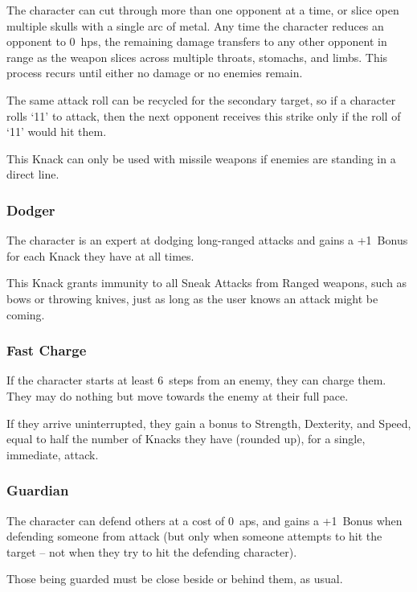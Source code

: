 \begin{multicols}{2}
The character can cut through more than one opponent at a time, or slice open multiple skulls with a single arc of metal.
Any time the character reduces an opponent to 0~\glspl{hp}, the remaining damage transfers to any other opponent in range as the weapon slices across multiple throats, stomachs, and limbs.
This process recurs until either no damage or no enemies remain.

The same attack roll can be recycled for the secondary target, so if a character rolls `11' to attack, then the next opponent receives this strike only if the roll of `11' would hit them.

This Knack can only be used with missile weapons if enemies are standing in a direct line.

\subsubsection{Dodger}
\label{dodger}

The character is an expert at dodging long-ranged attacks and gains a +1~Bonus for each Knack they have at all times.

This Knack grants immunity to all Sneak Attacks from Ranged weapons, such as bows or throwing knives, just as long as the user knows an attack might be coming.

\subsubsection{Fast Charge}

If the character starts at least 6~\glspl{step} from an enemy, they can charge them.
They may do nothing but move towards the enemy at their full pace.

If they arrive uninterrupted, they gain a bonus to Strength, Dexterity, and Speed, equal to half the number of Knacks they have (rounded up), for a single, immediate, attack.

\subsubsection{Guardian}

The character can defend others at a cost of 0~\glspl{ap}, and gains a +1~Bonus when defending someone from attack (but only when someone attempts to hit the target -- not when they try to hit the defending character).

Those being guarded must be close beside or behind them, as usual.


\end{multicols}
